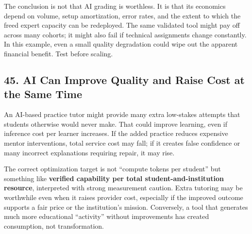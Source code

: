 The conclusion is not that AI grading is worthless. It is that its economics depend on volume, setup amortization, error rates, and the extent to which the freed expert capacity can be redeployed. The same validated tool might pay off across many cohorts; it might also fail if technical assignments change constantly. In this example, even a small quality degradation could wipe out the apparent financial benefit. Test before scaling.

\subsection*{45. AI Can Improve Quality and Raise Cost at the Same Time}

An AI-based practice tutor might provide many extra low-stakes attempts that students otherwise would never make. That could improve learning, even if inference cost per learner increases. If the added practice reduces expensive mentor interventions, total service cost may fall; if it creates false confidence or many incorrect explanations requiring repair, it may rise.

The correct optimization target is not ``compute tokens per student'' but something like \textbf{verified capability per total student-and-institution resource}, interpreted with strong measurement caution. Extra tutoring may be worthwhile even when it raises provider cost, especially if the improved outcome supports a fair price or the institution's mission. Conversely, a tool that generates much more educational ``activity'' without improvements has created consumption, not transformation.
